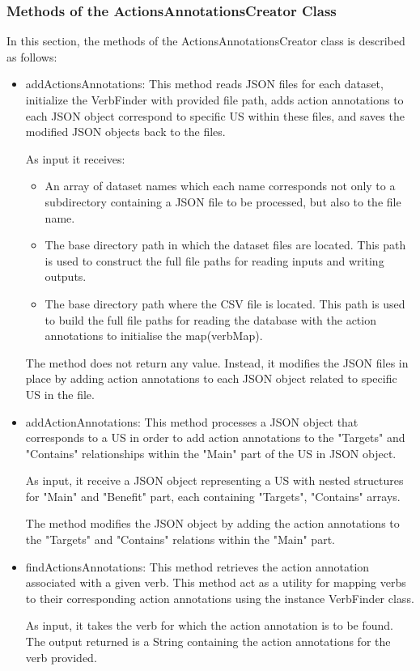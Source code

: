 \subsubsection*{Methods of the ActionsAnnotationsCreator Class}
In this section, the methods of the ActionsAnnotationsCreator class is described as follows:
\begin{itemize}	
	\item addActionsAnnotations: This method reads JSON files for each dataset, initialize the VerbFinder with provided file path, adds action annotations to each JSON object correspond to specific US within these files, and saves the modified JSON objects back to the files.
	
	As input it receives:
	\begin{itemize}
		\item An array of dataset names which each name corresponds not only to a subdirectory containing a JSON file to be processed, but also to the file name. 
		
		\item The base directory path in which the dataset files are located. This path is used to construct the full file paths for reading inputs and writing outputs.
		
		\item The base directory path where the CSV file is located. This path is used to build the full file paths for reading the database with the action annotations to initialise the map(verbMap).
	\end{itemize}
	
	The method does not return any value. Instead, it modifies the JSON files in place by adding action annotations to each JSON object related to specific US in the file.
	
	\item addActionAnnotations: This method processes a JSON object that corresponds to a US in order to add action annotations to the "Targets" and "Contains" relationships within the "Main" part of the US in JSON object.
	
	As input, it receive a JSON object representing a US with nested structures for "Main" and "Benefit" part, each containing "Targets", "Contains" arrays.
	
	The method modifies the JSON object by adding the action annotations to the "Targets" and "Contains" relations within the "Main" part.
		
	\item findActionsAnnotations: This method retrieves the action annotation associated with a given verb. This method act as a utility for mapping verbs to their corresponding action annotations using the instance VerbFinder class.
	
	As input, it takes the verb for which the action annotation is to be found. The output returned is a String containing the action annotations for the verb provided.	
\end{itemize}

